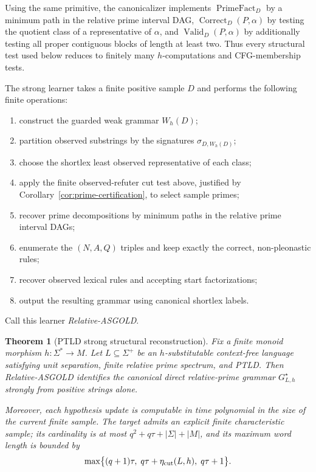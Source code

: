 \documentclass[11pt,a4paper]{article}
\newtheorem{theorem}{Theorem}[section]
\begin{document}
Using the same primitive, the canonicalizer implements $\operatorname{PrimeFact}_D$ by a minimum path in the relative prime interval DAG, $\operatorname{Correct}_D(P,\alpha)$ by testing the quotient class of a representative of $\alpha$, and $\operatorname{Valid}_D(P,\alpha)$ by additionally testing all proper contiguous blocks of length at least two.  Thus every structural test used below reduces to finitely many $h$-computations and CFG-membership tests.

The strong learner takes a finite positive sample $D$ and performs the following finite operations:
\begin{enumerate}[leftmargin=2.2em]
\item construct the guarded weak grammar $W_h(D)$;
\item partition observed substrings by the signatures $\sigma_{D,W_h(D)}$;
\item choose the shortlex least observed representative of each class;
\item apply the finite observed-refuter cut test above, justified by Corollary~\ref{cor:prime-certification}, to select sample primes;
\item recover prime decompositions by minimum paths in the relative prime interval DAGs;
\item enumerate the $(N,A,Q)$ triples and keep exactly the correct, non-pleonastic rules;
\item recover observed lexical rules and accepting start factorizations;
\item output the resulting grammar using canonical shortlex labels.
\end{enumerate}
Call this learner \emph{Relative-ASGOLD}.

\begin{theorem}[PTLD strong structural reconstruction]
\label{thm:ptld-strong}
Fix a finite monoid morphism $h:\Sigma^*\to M$.  Let $L\subseteq\Sigma^+$ be an $h$-substitutable context-free language satisfying unit separation, finite relative prime spectrum, and PTLD.  Then Relative-ASGOLD identifies the canonical direct relative-prime grammar $G^\star_{L,h}$ strongly from positive strings alone.

Moreover, each hypothesis update is computable in time polynomial in the size of the current finite sample.  The target admits an explicit finite characteristic sample; its cardinality is at most $q^2+q\tau+|\Sigma|+|M|$, and its maximum word length is bounded by
\[
  \max\bigl\{(q+1)\tau,\;q\tau+\eta_{\rm cut}(L,h),\;q\tau+1\bigr\}.
\]
\end{theorem}
\end{document}
